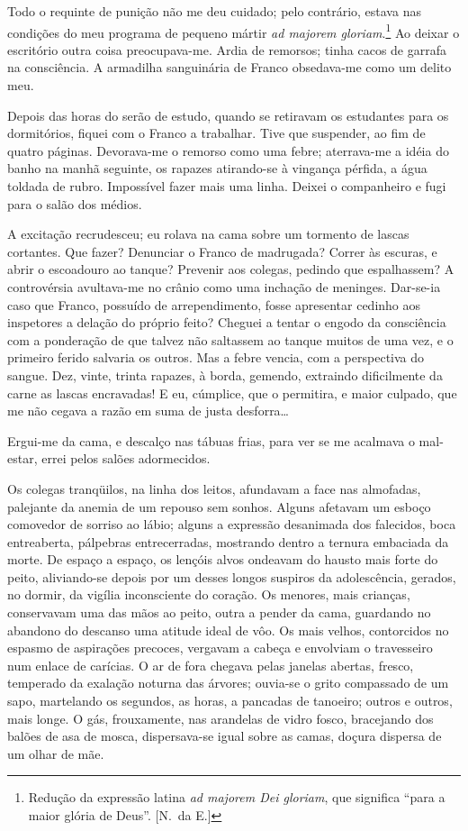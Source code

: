 Todo o requinte de punição não me deu cuidado; pelo
contrário, estava nas condições do meu programa de pequeno mártir \textit{ad
majorem gloriam}.\footnote{ Redução da expressão latina \textit{ad majorem Dei gloriam}, 
que significa ``para a maior glória de Deus''. [N.~da E.]} 
Ao deixar o escritório outra coisa preocupava{}-me.
Ardia de remorsos; tinha cacos de garrafa na consciência. A armadilha
sanguinária de Franco obsedava{}-me como um delito meu. 

Depois das horas do serão de estudo, quando se retiravam os estudantes para os
dormitórios, fiquei com o Franco a trabalhar. Tive que suspender, ao
fim de quatro páginas. Devorava{}-me o remorso como uma febre;
aterrava{}-me a idéia do banho na manhã seguinte, os rapazes
atirando{}-se à vingança pérfida, a água toldada de rubro. Impossível
fazer mais uma linha. Deixei o companheiro e fugi para o salão dos médios. 

A excitação recrudesceu; eu rolava na cama sobre um tormento de
lascas cortantes. Que fazer? Denunciar o Franco de madrugada? Correr às
escuras, e abrir o escoadouro ao tanque? Prevenir aos colegas, pedindo
que espalhassem? A controvérsia avultava{}-me no crânio como uma
inchação de meninges. Dar{}-se{}-ia caso que Franco, possuído de
arrependimento, fosse apresentar cedinho aos inspetores a delação do
próprio feito? Cheguei a tentar o engodo da consciência com a
ponderação de que talvez não saltassem ao tanque muitos de uma vez, e o
primeiro ferido salvaria os outros. Mas a febre vencia, com a
perspectiva do sangue. Dez, vinte, trinta rapazes, à borda, gemendo,
extraindo dificilmente da carne as lascas encravadas! E eu, cúmplice,
que o permitira, e maior culpado, que me não cegava a razão em suma de
justa desforra\ldots 

Ergui{}-me da cama, e descalço nas tábuas frias, para
ver se me acalmava o mal{}-estar, errei pelos salões adormecidos. 

Os colegas tranqüilos, na linha dos leitos, afundavam a face nas
almofadas, palejante da anemia de um repouso sem sonhos. Alguns
afetavam um esboço comovedor de sorriso ao lábio; alguns a expressão
desanimada dos falecidos, boca entreaberta, pálpebras entrecerradas,
mostrando dentro a ternura embaciada da morte. De espaço a espaço, os
lençóis alvos ondeavam do hausto mais forte do peito, aliviando{}-se
depois por um desses longos suspiros da adolescência, gerados, no
dormir, da vigília inconsciente do coração. Os menores, mais crianças,
conservavam uma das mãos ao peito, outra a pender da cama, guardando no
abandono do descanso uma atitude ideal de vôo. Os mais velhos,
contorcidos no espasmo de aspirações precoces, vergavam a cabeça e
envolviam o travesseiro num enlace de carícias. O ar de fora chegava
pelas janelas abertas, fresco, temperado da exalação noturna das
árvores; ouvia{}-se o grito compassado de um sapo, martelando os
segundos, as horas, a pancadas de tanoeiro; outros e outros, mais
longe. O gás, frouxamente, nas arandelas de vidro fosco, bracejando dos
balões de asa de mosca, dispersava{}-se igual sobre as camas, doçura
dispersa de um olhar de mãe. 

